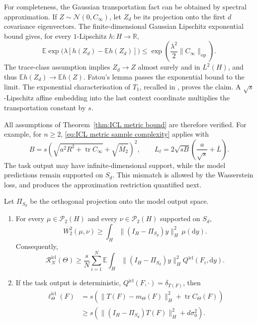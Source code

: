 \begin{example}
For completeness, the Gaussian transportation fact can be obtained by spectral approximation. If \(Z\sim\mathcal N(0,C_\infty)\), let \(Z_d\) be its projection onto the first \(d\) covariance eigenvectors. The finite-dimensional Gaussian Lipschitz exponential bound gives, for every \(1\)-Lipschitz \(h:H\to\mathbb R\),
\[
\mathbb E\exp\bigl(\lambda[h(Z_d)-\mathbb Eh(Z_d)]\bigr)
\leqslant\exp\left(\frac{\lambda^2}{2}\|C_\infty\|_{\mathrm{op}}\right).
\]
The trace-class assumption implies \(Z_d\to Z\) almost surely and in \(L^2(H)\), and thus \(\mathbb Eh(Z_d)\to\mathbb Eh(Z)\). Fatou's lemma passes the exponential bound to the limit. The exponential characterisation of \(T_1\), recalled in \cite[Theorem~1.1]{DjelloutGuillinWu2004}, proves the claim. A \(\sqrt s\)-Lipschitz affine embedding into the last context coordinate multiplies the transportation constant by \(s\).

All assumptions of Theorem~\ref{thm:ICL metric bound} are therefore verified. For example, for \(n\geqslant2\), \eqref{eq:ICL metric sample complexity} applies with
\[
B=s\left(\sqrt{a^2R^2+\operatorname{tr}C_\infty}+\sqrt{\overline M_2}\right)^2,
\qquad
L_\ell=2\sqrt{sB}\left(\frac a{\sqrt s}+\overline L\right).
\]
The task output may have infinite-dimensional support, while the model predictions remain supported on \(S_d\). This mismatch is allowed by the Wasserstein loss, and produces the approximation restriction quantified next.
\end{example}

\begin{proposition}
\label{prop:ICL approximation floors}
Let \(\Pi_{S_d}\) be the orthogonal projection onto the model output space.
\begin{enumerate}
\item For every \(\mu\in\mathcal P_2(H)\) and every \(\nu\in\mathcal P_2(H)\) supported on \(S_d\),
\begin{equation}
\label{eq:ICL projection floor}
W_2^2(\mu,\nu)\geqslant\int_H\|(I_H-\Pi_{S_d})y\|_H^2\,\mu(\mathrm dy).
\end{equation}
Consequently,
\[
\mathcal R_N^{\mathrm{icl}}(\Theta)
\geqslant\frac sN\sum_{i=1}^N\mathbb E
\int_H\|(I_H-\Pi_{S_d})y\|_H^2Q^{\mathrm{icl}}(F_i,\mathrm dy).
\]
\item If the task output is deterministic, \(Q^{\mathrm{icl}}(F,\cdot)=\delta_{T(F)}\), then
\begin{equation}
\label{eq:ICL deterministic floor}
\begin{aligned}
\ell_\Theta^{\mathrm{icl}}(F)
&=s\left(\|T(F)-m_\Theta(F)\|_H^2+\operatorname{tr}C_\Theta(F)\right)\\
&\geqslant s\left(\|(I_H-\Pi_{S_d})T(F)\|_H^2+d\sigma_0^2\right).
\end{aligned}
\end{equation}
\end{enumerate}
\end{proposition}

